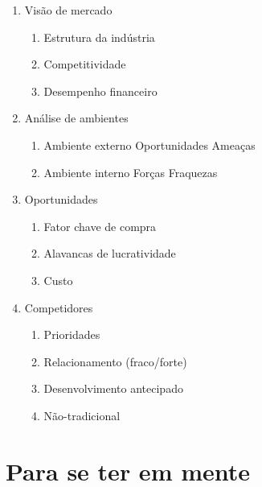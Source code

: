 \begin{enumerate}
	\item Visão de mercado
	\begin{enumerate}
		\item Estrutura da indústria
		\item Competitividade
		\item Desempenho financeiro
	\end{enumerate}
	\item Análise de ambientes
	\begin{enumerate}
		\item Ambiente externo
		\subitem Oportunidades
		\subitem Ameaças
		\item Ambiente interno
		\subitem Forças
		\subitem Fraquezas
	\end{enumerate}
	\item Oportunidades
	\begin{enumerate}
		\item Fator chave de compra
		\item Alavancas de lucratividade
		\item Custo
	\end{enumerate}
	\item Competidores
	\begin{enumerate}
		\item Prioridades
		\item Relacionamento (fraco/forte)
		\item Desenvolvimento antecipado
		\item Não-tradicional
	\end{enumerate}
\end{enumerate}


\section{Para se ter em mente}

